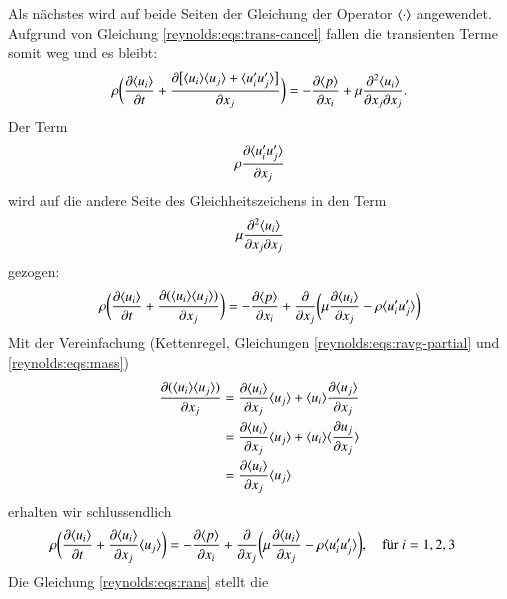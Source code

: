 %
Als nächstes wird auf beide Seiten der Gleichung der Operator $\ravg{\cdot}$ angewendet.
Aufgrund von Gleichung \eqref{reynolds:eqs:trans-cancel} fallen die transienten Terme somit
weg und es bleibt:
%
\begin{equation}
    \rho \biggl(
            \frac{\partial \ravg{u_i}}{\partial t} +
            \frac{\partial \bigl[ \ravg{u_i} \ravg{u_j} + \ravg{u_i' u_j'} \bigr]}{\partial x_j}
        \biggr) =
        - \frac{\partial \ravg{p}}{\partial x_i} + 
        \mu \frac{\partial^2 \ravg{u_i}}{\partial x_j \partial x_j}.
\end{equation}
%
Der Term 
%
$$\rho \frac{\partial \ravg{u_i' u_j'}}{\partial x_j}$$
%
wird auf die andere Seite des Gleichheitszeichens in den Term 
%
$$\mu \frac{\partial^2 \ravg{u_i}}{\partial x_j \partial x_j}$$
%
gezogen:
%
\begin{equation}
    \rho \biggl(
            \frac{\partial \ravg{u_i}}{\partial t} +
            \frac{\partial ( \ravg{u_i} \ravg{u_j})}{\partial x_j}
        \biggr) =
        - \frac{\partial \ravg{p}}{\partial x_i} + 
            \frac{\partial}{\partial x_j} 
                \biggl(
                    \mu \frac{\partial \ravg{u_i}}{\partial x_j} - \rho \ravg{u_i' u_j'}
                \biggr)
\end{equation}
%
Mit der Vereinfachung (Kettenregel, Gleichungen \eqref{reynolds:eqs:ravg-partial} und \eqref{reynolds:eqs:mass})
%
\begin{align}
    \frac{\partial ( \ravg{u_i} \ravg{u_j})}{\partial x_j} &=
    \frac{\partial \ravg{u_i}}{\partial x_j} \ravg{u_j} +
    \ravg{u_i} \frac{\partial \ravg{u_j}}{\partial x_j} \\
    &= \frac{\partial \ravg{u_i}}{\partial x_j} \ravg{u_j} +
    \ravg{u_i} \ravg{\frac{\partial u_j}{\partial x_j}} \\
    &= \frac{\partial \ravg{u_i}}{\partial x_j} \ravg{u_j}
\end{align}
%
erhalten wir schlussendlich
%
\begin{align}
    \label{reynolds:eqs:rans}
    \rho \biggl(
            \frac{\partial \ravg{u_i}}{\partial t} +
            \frac{\partial \ravg{u_i}}{\partial x_j} \ravg{u_j}
        \biggr) &=
        - \frac{\partial \ravg{p}}{\partial x_i} + 
            \frac{\partial}{\partial x_j}
            \biggl(
                \mu \frac{\partial \ravg{u_i}}{\partial x_j} - \rho \ravg{u_i' u_j'}
            \biggr),\quad\text{für $i=1,2,3$}
\end{align}
%
Die Gleichung \eqref{reynolds:eqs:rans} stellt die
